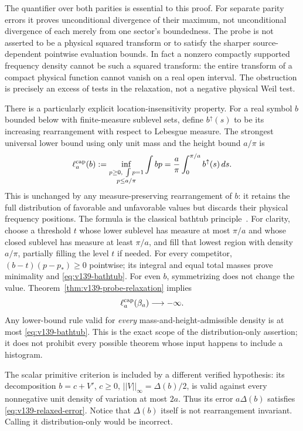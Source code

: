 \documentclass[11pt]{article}
\def\norm#1{||#1||}%
\theoremstyle{remark}
\newcommand{\norm}[1]{\left\lVert #1\right\rVert}
\begin{document}
The quantifier over both parities is essential to this proof.
For separate parity errors it proves unconditional divergence of
their maximum, not unconditional divergence of each merely from
one sector's boundedness. The probe is not asserted to be a physical
squared transform or to satisfy the sharper source-dependent
pointwise evaluation bounds. In fact a nonzero compactly supported
frequency density cannot be such a squared transform: the entire
transform of a compact physical function cannot vanish on a real
open interval. The obstruction is precisely an excess of tests
in the relaxation, not a negative physical Weil test.

There is a particularly explicit location-insensitivity property.
For a real symbol $b$ bounded below with finite-measure sublevel sets,
define $b^\uparrow(s)$ to be its increasing rearrangement with respect
to Lebesgue measure. The strongest universal lower bound using only
unit mass and the height bound $a/\pi$ is
\begin{equation}\label{eq:v139-bathtub}
 \ell_a^{\rm cap}(b):=
 \inf_{\substack{p\ge0,\ \int p=1\\p\le a/\pi}}
        \int bp
 =\frac a\pi\int_0^{\pi/a} b^\uparrow(s)\,ds.
\end{equation}
This is unchanged by any measure-preserving rearrangement of $b$:
it retains the full distribution of favorable and unfavorable values
but discards their physical frequency positions. The formula is the
classical bathtub principle~\cite[Section 1.14]{LiebLoss2001}.
For clarity, choose a threshold $t$ whose lower sublevel has measure
at most $\pi/a$ and whose closed sublevel has measure at least
$\pi/a$, and fill that lowest region with density $a/\pi$, partially
filling the level $t$ if needed. For every competitor,
$(b-t)(p-p_*)\ge0$ pointwise; its integral and equal total masses
prove minimality and \eqref{eq:v139-bathtub}.
For even $b$, symmetrizing does not change the value.
Theorem~\ref{thm:v139-probe-relaxation} implies
\begin{equation}\label{eq:v139-cap-divergence}
 \ell_a^{\rm cap}(\beta_a)\longrightarrow-\infty.
\end{equation}
Any lower-bound rule valid for \emph{every} mass-and-height-admissible
density is at most \eqref{eq:v139-bathtub}. This is the exact scope of
the distribution-only assertion; it does not prohibit every possible
theorem whose input happens to include a histogram.

The scalar primitive criterion is included by a different verified
hypothesis: its decomposition $b=c+V'$, $c\ge0$,
$\norm V_\infty=\Delta(b)/2$, is valid against every nonnegative
unit density of variation at most $2a$. Thus its error $a\Delta(b)$
satisfies \eqref{eq:v139-relaxed-error}. Notice that $\Delta(b)$
itself is not rearrangement invariant. Calling it distribution-only
would be incorrect.
\end{document}

